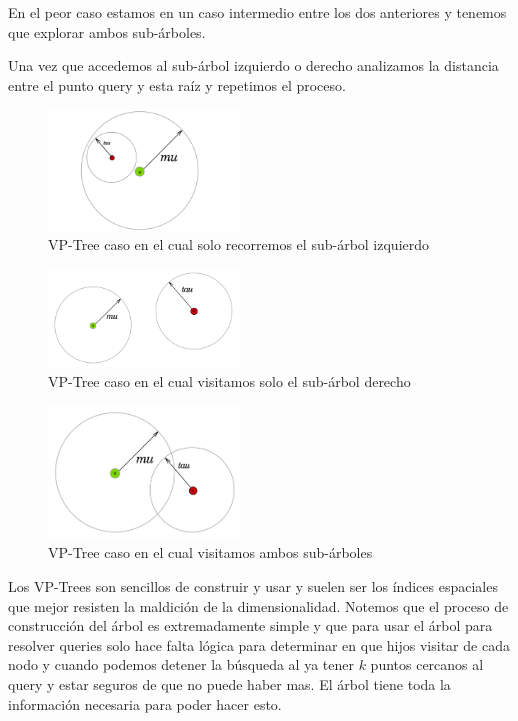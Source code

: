 En el peor caso estamos en un caso intermedio entre los dos anteriores y tenemos que explorar ambos sub-árboles. 

Una vez que accedemos al sub-árbol izquierdo o derecho analizamos la distancia entre el punto query y esta raíz y repetimos el proceso.

\begin{figure}[!htb]
\centering
\includegraphics[width=2in]{figures/vptree1.png}

\caption{VP-Tree caso en el cual solo recorremos el sub-árbol izquierdo}
\label{fig:vptree1}
\end{figure}

\begin{figure}[!htb]
\centering
\includegraphics[width=2in]{figures/vptree2.png}

\caption{VP-Tree caso en el cual visitamos solo el sub-árbol derecho}
\label{fig:vptree2}
\end{figure}

\begin{figure}[!htb]
\centering
\includegraphics[width=2in]{figures/vptree3.png}

\caption{VP-Tree caso en el cual visitamos ambos sub-árboles}
\label{fig:vptree3}
\end{figure}

Los VP-Trees son sencillos de construir y usar y suelen ser los índices espaciales que mejor resisten la maldición de la dimensionalidad. Notemos que el proceso de construcción del árbol es extremadamente simple y que para usar el árbol para resolver queries solo hace falta lógica para determinar en que hijos visitar de cada nodo y cuando podemos detener la búsqueda al ya tener $k$ puntos cercanos al query y estar seguros de que no puede haber mas. El árbol tiene toda la información necesaria para poder hacer esto.

